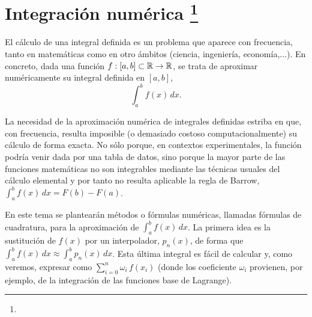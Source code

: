 \newcommand{\ox}{\overline x}

\chapter[Integración numérica]{Integración numérica%
\footnote{\licenseInfo}}
\label{cha:integracion-numerica}

El cálculo de una integral definida es un problema que aparece con
frecuencia, tanto en matemáticas como en otro ámbitos (ciencia,
ingeniería, economía,...). En concreto, dada una función
$f:[a,b]\subset\operatorname{{\mathbb R}}\to\operatorname{{\mathbb R}}$, se trata de aproximar numéricamente su
integral definida en $[a,b]$,
\begin{equation*}
  \int_a^bf(x)\,dx.
\end{equation*}

La necesidad de la aproximación numérica de integrales definidas
estriba en que, con frecuencia, resulta imposible (o demasiado costoso
computacionalmente) su cálculo de forma exacta. No sólo porque, en
contextos experimentales, la función podría venir dada por una tabla
de datos, sino porque la mayor parte de las funciones matemáticas no
son integrables mediante las técnicas usuales del cálculo elemental
y por tanto no resulta aplicable la regla de Barrow, $\int_a^b f(x)\,
dx=F(b)-F(a)$.

En este tema se plantearán métodos o fórmulas numéricas, llamadas
fórmulas de cuadratura, para la aproximación de $\int_a^b f(x)\,
dx$. La primera idea es la sustitución de $f(x)$ por un interpolador,
$p_n(x)$, de forma que $\int_a^bf(x)\,dx \approx \int_a^b p_n(x)\,
dx$. Esta última integral es fácil de calcular y, como veremos,
expresar como $\sum_{i=0}^n \omega_i \, f(x_i)$ (donde los coeficiente
$\omega_i$ provienen, por ejemplo, de la integración de las
funciones base de Lagrange).


